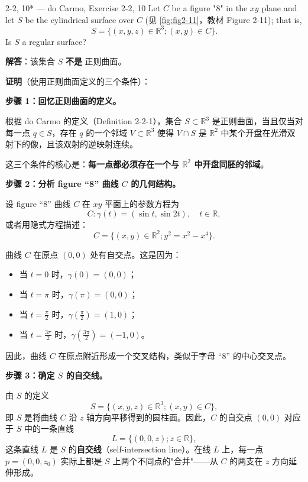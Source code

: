 \begin{exercise}{2-2, 10* — do Carmo, Exercise 2-2, 10}
Let $C$ be a figure "8" in the $xy$ plane and let $S$ be the cylindrical surface over $C$ (见 \cref{fig:fig2-11}，教材 Figure 2-11); that is,
\[
S = \{(x, y, z) \in \mathbb{R}^3; (x, y) \in C \}.
\]
Is $S$ a regular surface?
\end{exercise}

\begin{solution}
\textbf{解答}：该集合 $S$ \textbf{不是} 正则曲面。

\vspace{1ex}
\textbf{证明}（使用正则曲面定义的三个条件）：

\vspace{1ex}
\noindent\textbf{步骤 1：回忆正则曲面的定义。}

根据 do Carmo 的定义（Definition 2-2-1），集合 $S \subset \mathbb{R}^3$ 是正则曲面，当且仅当对每一点 $q \in S$，存在 $q$ 的一个邻域 $V \subset \mathbb{R}^3$ 使得 $V \cap S$ 是 $\mathbb{R}^2$ 中某个开盘在光滑双射下的像，且该双射的逆映射连续。

这三个条件的核心是：\textbf{每一点都必须存在一个与 $\mathbb{R}^2$ 中开盘同胚的邻域}。

\vspace{1ex}
\noindent\textbf{步骤 2：分析 figure ``8'' 曲线 $C$ 的几何结构。}

设 figure ``8'' 曲线 $C$ 在 $xy$ 平面上的参数方程为
\[
C : \gamma(t) = (\sin t, \sin 2t), \quad t \in \mathbb{R},
\]
或者用隐式方程描述：
\[
C = \{(x, y) \in \mathbb{R}^2 ; y^2 = x^2 - x^4\}.
\]

曲线 $C$ 在原点 $(0, 0)$ 处有自交点。这是因为：
\begin{itemize}
\item 当 $t = 0$ 时，$\gamma(0) = (0, 0)$；
\item 当 $t = \pi$ 时，$\gamma(\pi) = (0, 0)$；
\item 当 $t = \frac{\pi}{2}$ 时，$\gamma(\frac{\pi}{2}) = (1, 0)$；
\item 当 $t = \frac{3\pi}{2}$ 时，$\gamma(\frac{3\pi}{2}) = (-1, 0)$。
\end{itemize}
因此，曲线 $C$ 在原点附近形成一个交叉结构，类似于字母 ``8'' 的中心交叉点。

\vspace{1ex}
\noindent\textbf{步骤 3：确定 $S$ 的自交线。}

由 $S$ 的定义
\[
S = \{(x, y, z) \in \mathbb{R}^3 ; (x, y) \in C\},
\]
即 $S$ 是将曲线 $C$ 沿 $z$ 轴方向平移得到的圆柱面。因此，$C$ 的自交点 $(0, 0)$ 对应于 $S$ 中的一条直线
\[
L = \{(0, 0, z) ; z \in \mathbb{R}\},
\]
这条直线 $L$ 是 $S$ 的\textbf{自交线}（self-intersection line）。在线 $L$ 上，每一点 $p = (0, 0, z_0)$ 实际上都是 $S$ 上两个不同点的"合并"——从 $C$ 的两支在 $z$ 方向延伸形成。


\end{solution}
